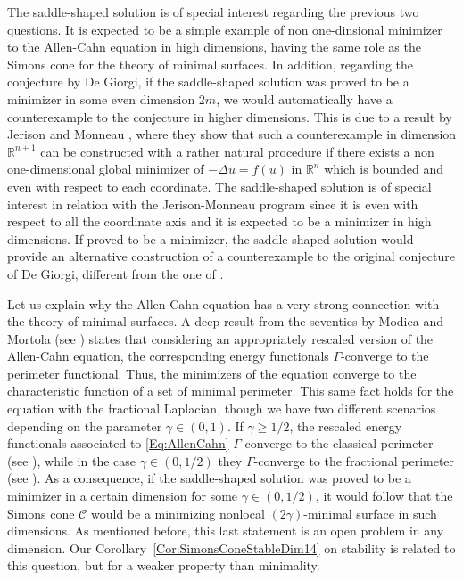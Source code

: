 \documentclass[twoside,leqno,symbols-for-thanks, draft]{rmi}
\numberwithin{equation}{section}
\theoremstyle{definition}
\newcommand{\con}[1]{\mathbb{#1}}
\newcommand{\R}{\con{R}} %
\newcommand{\ccal}{\mathscr{C}}
\newcommand{\s}{\gamma}
\begin{document}
The saddle-shaped solution is of special interest regarding the previous two questions. It is expected to be a simple example of non one-dinsional minimizer to the Allen-Cahn equation in high dimensions, having the same role as the Simons cone for the theory of minimal surfaces. In addition, regarding the conjecture by De Giorgi, if the saddle-shaped solution was proved to be a minimizer in some even dimension $2m$, we would automatically have a counterexample to the conjecture in higher dimensions. This is due to a result by Jerison and Monneau \cite{JerisonMonneau}, where they show that such a counterexample in dimension $\R^{n+1}$ can be constructed with a rather natural procedure if there exists a non one-dimensional global minimizer of $-\Delta u = f(u)$ in $\R^n$ which is bounded and even with respect to each coordinate. The saddle-shaped solution is of special interest in relation with the Jerison-Monneau program since it is even with respect to all the coordinate axis and it is expected to be a minimizer in high dimensions. If proved to be a minimizer, the saddle-shaped solution would provide an alternative construction of a counterexample to the original conjecture of De Giorgi, different from the one of \cite{delPinoKowalczykWei}.


Let us explain why the Allen-Cahn equation has a very strong connection with the theory of minimal surfaces. A deep result from the seventies by Modica and Mortola (see \cite{Modica,ModicaMortola}) states that considering an appropriately rescaled version of the Allen-Cahn equation, the corresponding energy functionals $\Gamma$-converge to the perimeter functional. Thus, the minimizers of the equation converge to the characteristic function of a set of minimal perimeter. This same fact holds for the equation with the fractional Laplacian, though we have two different scenarios depending on the parameter $\s \in (0,1)$. If $\s \geq 1/2$, the rescaled energy functionals associated to \eqref{Eq:AllenCahn} $\Gamma$-converge to the classical perimeter (see \cite{AlbertiBouchitteSeppecher,Gonzalez}), while in the case $\s \in (0,1/2)$ they $\Gamma$-converge to the fractional perimeter (see \cite{SavinValdinoci-GammaConvergence}). As a consequence, if the saddle-shaped solution was proved to be a minimizer in a certain dimension for some $\s \in (0,1/2)$, it would follow that the Simons cone $\ccal$ would be a minimizing nonlocal $(2\s)$-minimal surface in such dimensions. As mentioned before, this last statement is an open problem in any dimension. Our Corollary~\ref{Cor:SimonsConeStableDim14} on stability is related to this question, but for a weaker property than minimality.
\end{document}
